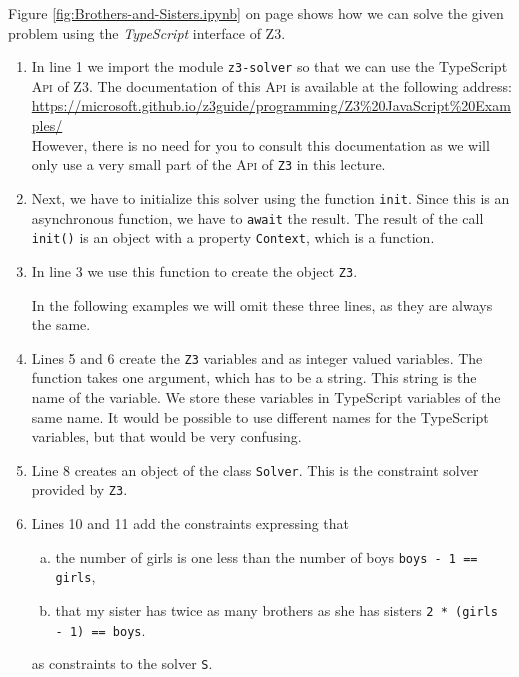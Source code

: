 \noindent
Figure \ref{fig:Brothers-and-Sisters.ipynb} on page \pageref{fig:Brothers-and-Sisters.ipynb} shows how we can
solve the given problem using the \textsl{TypeScript}
interface of Z3.
\begin{enumerate}
\item In line 1 we import the module \texttt{z3-solver} so that we can use the TypeScript \textsc{Api} of Z3.
      The documentation of this \textsc{Api} is available at the following address:
      \\[0.2cm]
      \hspace*{1.0cm}
      \url{https://microsoft.github.io/z3guide/programming/Z3%20JavaScript%20Examples/}
      \\[0.2cm]
      However, there is no need for you to consult this documentation as we will only use a very small part of
      the \textsc{Api} of \texttt{Z3} in this lecture.
\item Next, we have to initialize this solver using the function \texttt{init}.
      Since this is an asynchronous function, we have to \texttt{await} the result. The result of the call
      \texttt{init()} is an object with a property \texttt{Context}, which is a function.
\item In line 3 we use this function to create the object \texttt{Z3}.
      
      In the following examples we will omit these three lines, as they are always the same.
\item Lines 5 and 6 create the \texttt{Z3} variables  and  as integer valued variables.
      The function  takes one argument, which has to be a string.  This string is the name of the
      variable.  We store these variables in TypeScript variables of the same name.  It would be possible to use
      different names for the TypeScript variables, but that would be very confusing.
\item Line 8 creates an object of the class \texttt{Solver}.  This is the constraint solver provided by
      \texttt{Z3}.
      \item Lines 10 and 11 add the constraints expressing that
      \begin{enumerate}[(a)]
      \item the number of girls is one less than the number of boys \texttt{boys - 1 == girls},
      \item that my sister has twice as many brothers as she has sisters \texttt{2 * (girls - 1) == boys}.
      \end{enumerate}
      as constraints to the solver \texttt{S}.


\end{enumerate}
